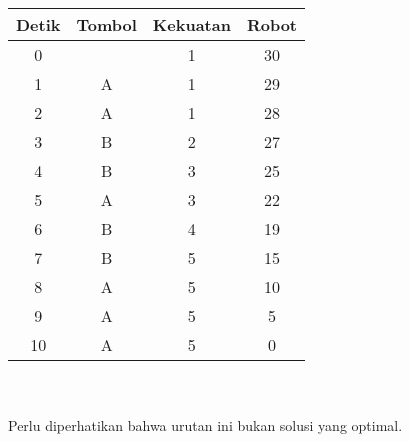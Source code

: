 \documentclass{article}
\begin{document}
\begin{tabular}{ | c | c | c | c | }
    \hline
    Detik & Tombol & Kekuatan & Robot \\ 
    \hline
    0 &  & 1 & 30\\  
    \hline
    1 & A & 1 & 29\\  
    \hline
    2 & A & 1 & 28\\  
    \hline
    3 & B & 2 & 27\\  
    \hline
    4 & B & 3 & 25\\  
    \hline
    5 & A & 3 & 22\\  
    \hline
    6 & B & 4 & 19\\  
    \hline
    7 & B & 5 & 15\\  
    \hline
    8 & A & 5 & 10\\  
    \hline
    9 & A & 5 & 5\\  
    \hline
    10 & A & 5 & 0\\  
    \hline
\end{tabular}
\\
\\
Perlu diperhatikan bahwa urutan ini bukan solusi yang optimal.

\pagebreak
\end{document}
